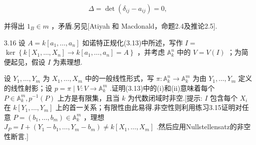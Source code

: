 \[
\Delta  = \det \left( {{\delta }_{ij} - {a}_{ij}}\right)  = 0,
\]

并得出 \({1}_{B} \in  m\) ，矛盾.另见[Atiyah 和 Macdonald，命题2.4及推论2.5].

3.16 设 \(A = k\left\lbrack  {{a}_{1},\ldots ,{a}_{n}}\right\rbrack\) 如诺特正规化(3.13)中所述，写作 \(I =\)  \(\ker \left\{  {k\left\lbrack  {{X}_{1},\ldots ,{X}_{n}}\right\rbrack   \rightarrow  k\left\lbrack  {{a}_{1},\ldots ,{a}_{n}}\right\rbrack   = A}\right\}\) ，并考虑 \({\mathbb{A}}_{k}^{n}\) 中的 \(V = V\left( I\right)\) ；为简便起见，假设 \(I\) 为素理想.

设 \({Y}_{1},\ldots ,{Y}_{m}\) 为 \({X}_{1},\ldots ,{X}_{m}\) 中的一般线性形式，写 \(\pi  : {\mathbb{A}}_{k}^{n} \rightarrow  {\mathbb{A}}_{k}^{m}\) 为由 \({Y}_{1},\ldots ,{Y}_{m}\) 定义的线性射影；设 \(p = \pi  \mid  V : V \rightarrow  {\mathbb{A}}_{k}^{m}\) .证明(3.13)中的(i)和(ii)意味着每个 \(P \in  {\mathbb{A}}_{k}^{m},{p}^{-1}\left( P\right)\) 上方是有限集，且当 \(k\) 为代数闭域时非空.[提示: \(I\) 包含每个 \({X}_{i}\) 在 \(k\left\lbrack  {{Y}_{1},\ldots ,{Y}_{m}}\right\rbrack\) 上的首一关系；有限性由此易得.非空性则利用练习3.15证明对任意 \(P = \left( {{b}_{1},\ldots ,{b}_{m}}\right)  \in  {\mathbb{A}}_{k}^{m}\) ，理想 \({J}_{P} = I + \left( {{Y}_{1} - {b}_{1},\ldots ,{Y}_{m} - {b}_{m}}\right)  \neq  k\left\lbrack  {{X}_{1},\ldots ,{X}_{m}}\right\rbrack\) .然后应用Nullstellensatz的非空性断言.]
